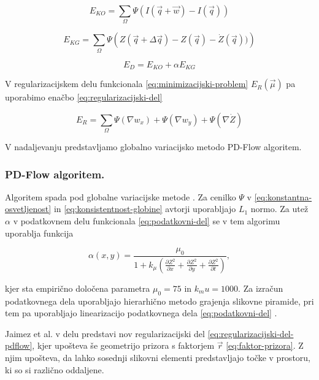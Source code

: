 \begin{equation}\label{eq:konstantna-osvetljenost}
	E_{KO} = \sum_\Omega \Psi( I(\vec{q} + \vec{w}) - I(\vec{q}))
\end{equation}

\begin{equation}\label{eq:konsistentnost-globine}
	E_{KG} = \sum_\Omega \Psi\left( Z(\vec{q} + \Delta \vec{q}) - Z(\vec{q}) - \dot{Z}(\vec{q}))\right)
\end{equation}

\begin{equation}\label{eq:podatkovni-del}
	E_D = E_{KO} + \alpha E_{KG}
\end{equation}

V regularizacijskem delu funkcionala \eqref{eq:minimizacijski-problem} $E_R(\vec{\mu})$ pa uporabimo enačbo \eqref{eq:regularizacijski-del}

\begin{equation}\label{eq:regularizacijski-del}
	E_R = \sum_\Omega \Psi\left( \nabla w_x \right) + \Psi\left( \nabla w_y \right) + \Psi\left( \nabla \dot{Z} \right)
\end{equation}

V nadaljevanju predstavljamo globalno variacijsko metodo PD-Flow algoritem.


\subsubsection{PD-Flow algoritem.}\label{sec:pd-flow}
Algoritem spada pod globalne variacijske metode \cite{jaimez2015primal}. Za cenilko $\Psi$ v \eqref{eq:konstantna-osvetljenost} in \eqref{eq:konsistentnost-globine} avtorji uporabljajo $L_1$ normo. Za utež $\alpha$ v podatkovnem delu funkcionala \eqref{eq:podatkovni-del} se v tem algorimu uporablja funkcija 

\begin{equation}\label{eq:utez}
 \alpha(x,y) = \frac{\mu_0}{1 + k_\mu \left( \frac{\partial Z^2}{\partial x} + \frac{\partial Z^2}{\partial y} + \frac{\partial Z^2}{\partial t} \right)},
\end{equation}

kjer sta empirično določena parametra $\mu_0 = 75$ in $k_mu = 1000$. Za izračun podatkovnega dela uporabljajo hierarhično metodo grajenja slikovne piramide, pri tem pa uporabljajo linearizacijo podatkovnega dela \eqref{eq:podatkovni-del} \cite{jaimez2015primal}.

Jaimez et al. v delu \cite{jaimez2015primal} predstavi nov regularizacijski del \eqref{eq:regularizacijski-del-pdflow}, kjer upošteva še geometrijo prizora s faktorjem $\vec{r}$ \eqref{eq:faktor-prizora}. Z njim upošteva, da lahko sosednji slikovni elementi predstavljajo točke v prostoru, ki so si različno oddaljene.

